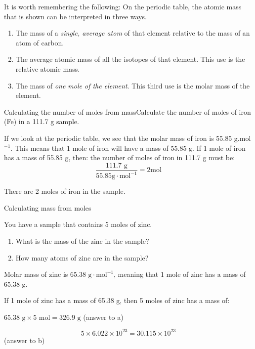 It is worth remembering the following: On the periodic table, the atomic mass that is shown can be interpreted in three ways.
\begin{enumerate}
\item{The mass of a \textit{single, average atom} of that element relative to the mass of an atom of carbon.}
\item{The average atomic mass of all the isotopes of that element. This use is the relative atomic mass.}
\item{The mass of \textit{one mole of the element}. This third use is the molar mass of the element.}
\end{enumerate}
\vspace{-.5cm}
\begin{wex}{Calculating the number of moles from mass}{Calculate the number of moles of iron (Fe) in a 111.7 g sample.}{ If we look at the periodic table, we see that the molar mass of iron is 55.85 g.mol$^{-1}$. This means that 1 mole of iron will have a mass of 55.85 g.
If 1 mole of iron has a mass of 55.85 g, then: the number of moles of iron in 111.7 g must be:
\begin{equation*}
\frac{111.7 \text{ g}}{55.85 \text{g} \cdot \text{mol}^{-1}} = 2 \text{mol}
\end{equation*}

There are 2 moles of iron in the sample.
}
\end{wex}
\vspace{-.5cm}
\begin{wex}{Calculating mass from moles}{You have a sample that contains 5 moles of zinc.
\begin{enumerate}
\item{What is the mass of the zinc in the sample?}
\item{How many atoms of zinc are in the sample?}
\end{enumerate}
}{
Molar mass of zinc is $65.38 \text{ g} \cdot \text{mol}^{-1}$, meaning that 1 mole of zinc has a mass of 65.38 g.

If 1 mole of zinc has a mass of 65.38 g, then 5 moles of zinc has a mass of:
\begin{center}
$65.38 \text{ g} \times 5 \text{ mol} = 326.9 \text{ g}$ (answer to a)
\end{center}

\begin{equation*}
5 \times 6.022 \times 10^{23} = 30.115 \times 10^{23}
\end{equation*}
(answer to b) }
\end{wex}

